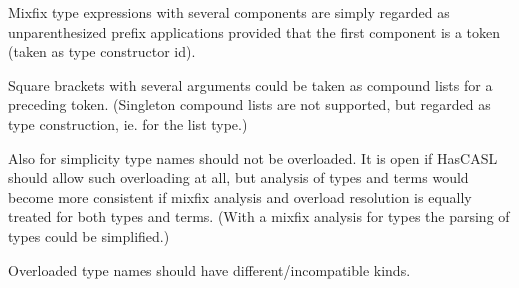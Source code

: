 \documentclass{article}
\begin{document}
Mixfix type expressions with several components are simply regarded as
unparenthesized prefix applications provided that the first component is a
token (taken as type constructor id). 

Square brackets with several arguments could be taken as compound lists for a
preceding token. (Singleton compound lists are not supported, but regarded as
type construction, ie. for the list type.)

Also for simplicity type names should not be overloaded. It is open if HasCASL
should allow such overloading at all, but analysis of types and terms would
become more consistent if mixfix analysis and overload resolution is equally
treated for both types and terms. (With a mixfix analysis for types the
parsing of types could be simplified.)

Overloaded type names should have different/incompatible kinds. 
\end{document}
